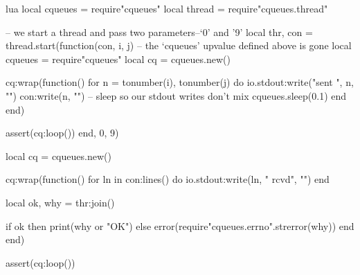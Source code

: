 \documentclass[11pt, oneside]{memoir}
\begin{document}
\begin{example}{lua}
local cqueues = require"cqueues"
local thread = require"cqueues.thread"

-- we start a thread and pass two parameters--`0' and '9'
local thr, con = thread.start(function(con, i, j)
	-- the `cqueues' upvalue defined above is gone
	local cqueues = require"cqueues"
	local cq = cqueues.new()

	cq:wrap(function()
		for n = tonumber(i), tonumber(j) do
			io.stdout:write("sent ", n, "\n")
			con:write(n, "\n")
			 -- sleep so our stdout writes don't mix
			cqueues.sleep(0.1)
		end
	end)

	assert(cq:loop())
end, 0, 9)


local cq = cqueues.new()

cq:wrap(function()
	for ln in con:lines() do
		io.stdout:write(ln, " rcvd", "\n")
	end

	local ok, why = thr:join()

	if ok then
		print(why or "OK")
	else
		error(require"cqueues.errno".strerror(why))
	end
end)

assert(cq:loop())
\end{example}



\appendix
\printindex
\end{document}
